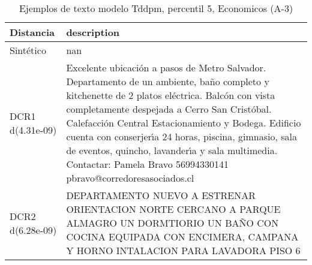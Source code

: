 \begin{table}[H]
\centering
\fontsize{10}{14}\selectfont
\caption{Ejemplos de texto modelo Tddpm, percentil 5, Economicos (A-3)}
\label{table-example-economicos-a-3-tddpm_mlp-5p-text}
\begin{tabular}{|l|m{35em}|}
\hline
\rowcolor[gray]{0.8}
Distancia & description \\
\hline Sintético & nan \\
\hline DCR1 d(4.31e-09) & Excelente ubicaci\'on a pasos de Metro Salvador. Departamento de un ambiente, ba\~no completo y kitchenette de 2 platos el\'ectrica. Balc\'on con vista completamente despejada a Cerro San Crist\'obal. Calefacci\'on Central Estacionamiento y Bodega.  Edificio cuenta con conserjer{\'\i}a 24 horas, piscina, gimnasio, sala de eventos, quincho, lavander{\'\i}a y sala multimedia.  Contactar:  Pamela Bravo 56994330141 pbravo@corredoresasociados.cl \\
\hline DCR2 d(6.28e-09) & DEPARTAMENTO NUEVO A ESTRENAR ORIENTACION NORTE CERCANO A PARQUE ALMAGRO UN DORMTIORIO UN BA\~NO CON COCINA EQUIPADA CON ENCIMERA, CAMPANA Y HORNO INTALACION PARA LAVADORA PISO 6 \\
\hline
\end{tabular}
\end{table}

